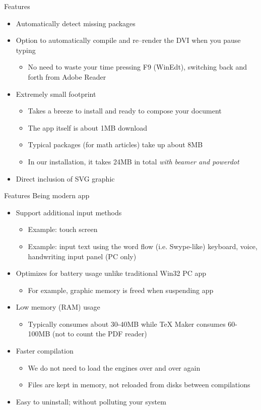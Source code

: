 \documentclass{beamer}
\begin{document}
\begin{frame}{Features}
\begin{itemize}
\item Automatically detect missing packages
\item Option to automatically compile and re--render the DVI when you pause typing
\begin{itemize}
\item No need to waste your time pressing F9 (WinEdt), switching back and forth from Adobe Reader
\end{itemize}
\item Extremely small footprint
\begin{itemize}
\item Takes a breeze to install and ready to compose your document
\item The app itself is about 1MB download
\item Typical packages (for math articles) take up about 8MB
\item In our installation, it takes 24MB in total \emph{with beamer and powerdot}
\end{itemize}
\item Direct inclusion of SVG graphic
\end{itemize}
\end{frame}

\begin{frame}{Features}
Being modern app
\begin{itemize}
\item Support additional input methods
\begin{itemize}
\item Example: touch screen
\item Example: input text using the word flow (i.e. Swype-like) keyboard, voice, handwriting input panel (PC only)
\end{itemize}
\item Optimizes for battery usage unlike traditional Win32 PC app
\begin{itemize}
\item For example, graphic memory is freed when suspending app
\end{itemize}
\item Low memory (RAM) usage
\begin{itemize}
\item Typically consumes about 30-40MB while TeX Maker consumes 60-100MB (not to count the PDF reader)
\end{itemize}
\item Faster compilation
\begin{itemize}
\item We do not need to load the engines over and over again
\item Files are kept in memory, not reloaded from disks between compilations
\end{itemize}
\item Easy to uninstall; without polluting your system
\end{itemize}
\end{frame}
\end{document}
